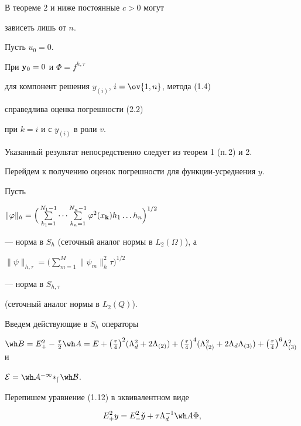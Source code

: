 В теореме 2 и ниже постоянные $c>0$ могут


зависеть лишь от $n$. 





\begin{cor} Пусть $u_0=0$.


При ${\bold y}_0=0$ и $\Phi=f^{h,\tau}$


для компонент решения $y_{(i)}$, $i=\ov{1,n}$, метода (1.4) 


справедлива оценка погрешности (2.2)


при $k=i$ и с $y_{(i)}$ в роли $v$. 


\end{cor}





Указанный результат непосредственно следует из теорем 1 (п.\,2) и 2.





Перейдем к получению оценок погрешности для функции-усреднения $y$.


Пусть


$\|\varphi\|_h=\Big(\sum\limits_{k_1=1}^{N_1-1}\dotsb


\sum\limits_{k_n=1}^{N_n-1}\varphi^2(x_{\bold k})h_1\dotsc h_n\Big)^{1/2}$ 


--- норма в $S_h$ (сеточный аналог нормы в $L_2(\Omega)$), а


$\|\psi\|_{h,\tau}=\Big(\sum\limits_{m=1}^M


\|\psi_m\|_h^2\tau\Big)^{1/2}$


--- норма в $S_{h,\tau}$


(сеточный аналог нормы в $L_2(Q)$).





Введем действующие в $S_h$ операторы


$\wh B =E_+^2-\frac{\tau}{2}\wh A =


E+\big(\frac{\tau}{4}\big)^2(\Lambda_d^2+2\Lambda_{(2)})+


\big(\frac{\tau}{4}\big)^4(\Lambda_{(2)}^2+2\Lambda_d\Lambda_{(3)})+


\big(\frac{\tau}{4}\big)^6\Lambda_{(3)}^2$ и


$\cal E=\wh A ^{-1}\Lambda_d\wh B $.


Перепишем уравнение (1.12) в эквивалентном виде


\begin{equation}


E_+^2 y=E_-^2 \Check y+\tau\Lambda_d^{-1}\wh A  \Phi,


\end{equation}


